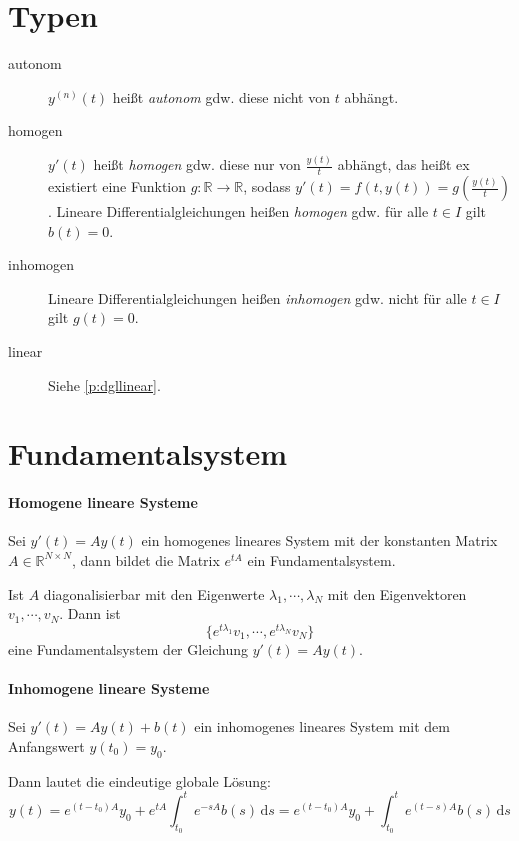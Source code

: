 		\section{Typen}
			\begin{description}
				\item[autonom] $ y ^ {(n)} (t) $ heißt \textit{autonom} gdw. diese nicht von $ t $ abhängt.
				\item[homogen] $ y'(t) $ heißt \textit{homogen} gdw. diese nur von $ \frac{y(t)}{t} $ abhängt, das heißt ex existiert eine Funktion $ g : \mathbb{R} \rightarrow \mathbb{R} $, sodass $ y'(t) = f(t, y(t)) = g(\frac{y(t)}{t}) $. Lineare Differentialgleichungen heißen \textit{homogen} gdw. für alle $ t \in I $ gilt $ b(t) = 0 $.
				\item[inhomogen] Lineare Differentialgleichungen heißen \textit{inhomogen} gdw. nicht für alle $ t \in I $ gilt $ g(t) = 0 $.
				\item[linear] Siehe \ref{p:dgllinear}.
			\end{description}

		\section{Fundamentalsystem}
			\paragraph{Homogene lineare Systeme}
				Sei $ y'(t) = Ay(t) $ ein homogenes lineares System mit der konstanten Matrix $ A \in \mathbb{R} ^ { N \times N } $, dann bildet die Matrix $ e ^ { tA } $ ein Fundamentalsystem.

				Ist $ A $ diagonalisierbar mit den Eigenwerte $ \lambda _ 1, \cdots, \lambda _ N $ mit den Eigenvektoren $ v _ 1, \cdots, v _ N $. Dann ist \[ \{ e ^ { t \lambda _ 1 } v _ 1, \cdots, e ^ { t \lambda _ N } v _ N \} \] eine Fundamentalsystem der Gleichung $ y'(t) = Ay(t) $.

			\paragraph{Inhomogene lineare Systeme}
				Sei $ y'(t) = Ay(t) + b(t) $ ein inhomogenes lineares System mit dem Anfangswert $ y(t _ 0) = y _ 0 $.

				Dann lautet die eindeutige globale Lösung:
				\begin{equation*}
					y(t) = e ^ { (t - t _ 0)A } y _ 0 + e ^ { tA } \int _ { t _ 0 } ^ t \! e ^ { -sA } b(s) \, \mathrm{d}s = e ^ { (t - t _ 0) A } y _ 0 + \int _ { t _ 0 } ^ t \! e ^ { (t - s) A } b(s) \, \mathrm{d}s
				\end{equation*}

